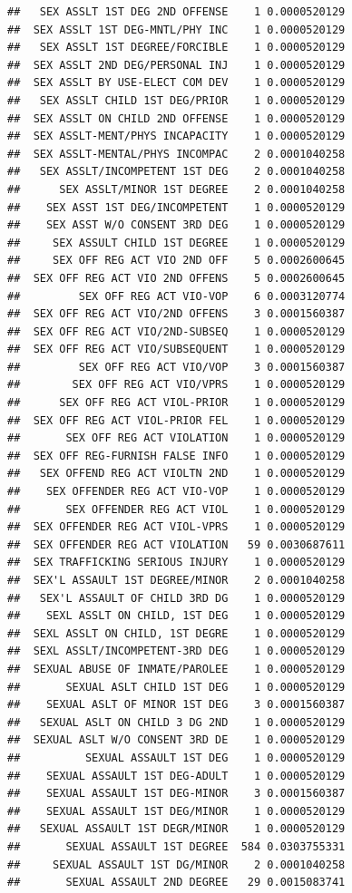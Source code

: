 \documentclass[]{book}
\begin{document}
\begin{verbatim}
##   SEX ASSLT 1ST DEG 2ND OFFENSE    1 0.0000520129
##  SEX ASSLT 1ST DEG-MNTL/PHY INC    1 0.0000520129
##   SEX ASSLT 1ST DEGREE/FORCIBLE    1 0.0000520129
##  SEX ASSLT 2ND DEG/PERSONAL INJ    1 0.0000520129
##  SEX ASSLT BY USE-ELECT COM DEV    1 0.0000520129
##   SEX ASSLT CHILD 1ST DEG/PRIOR    1 0.0000520129
##  SEX ASSLT ON CHILD 2ND OFFENSE    1 0.0000520129
##  SEX ASSLT-MENT/PHYS INCAPACITY    1 0.0000520129
##  SEX ASSLT-MENTAL/PHYS INCOMPAC    2 0.0001040258
##   SEX ASSLT/INCOMPETENT 1ST DEG    2 0.0001040258
##      SEX ASSLT/MINOR 1ST DEGREE    2 0.0001040258
##    SEX ASST 1ST DEG/INCOMPETENT    1 0.0000520129
##    SEX ASST W/O CONSENT 3RD DEG    1 0.0000520129
##     SEX ASSULT CHILD 1ST DEGREE    1 0.0000520129
##     SEX OFF REG ACT VIO 2ND OFF    5 0.0002600645
##  SEX OFF REG ACT VIO 2ND OFFENS    5 0.0002600645
##         SEX OFF REG ACT VIO-VOP    6 0.0003120774
##  SEX OFF REG ACT VIO/2ND OFFENS    3 0.0001560387
##  SEX OFF REG ACT VIO/2ND-SUBSEQ    1 0.0000520129
##  SEX OFF REG ACT VIO/SUBSEQUENT    1 0.0000520129
##         SEX OFF REG ACT VIO/VOP    3 0.0001560387
##        SEX OFF REG ACT VIO/VPRS    1 0.0000520129
##      SEX OFF REG ACT VIOL-PRIOR    1 0.0000520129
##  SEX OFF REG ACT VIOL-PRIOR FEL    1 0.0000520129
##       SEX OFF REG ACT VIOLATION    1 0.0000520129
##  SEX OFF REG-FURNISH FALSE INFO    1 0.0000520129
##   SEX OFFEND REG ACT VIOLTN 2ND    1 0.0000520129
##    SEX OFFENDER REG ACT VIO-VOP    1 0.0000520129
##       SEX OFFENDER REG ACT VIOL    1 0.0000520129
##  SEX OFFENDER REG ACT VIOL-VPRS    1 0.0000520129
##  SEX OFFENDER REG ACT VIOLATION   59 0.0030687611
##  SEX TRAFFICKING SERIOUS INJURY    1 0.0000520129
##  SEX'L ASSAULT 1ST DEGREE/MINOR    2 0.0001040258
##   SEX'L ASSAULT OF CHILD 3RD DG    1 0.0000520129
##    SEXL ASSLT ON CHILD, 1ST DEG    1 0.0000520129
##  SEXL ASSLT ON CHILD, 1ST DEGRE    1 0.0000520129
##  SEXL ASSLT/INCOMPETENT-3RD DEG    1 0.0000520129
##  SEXUAL ABUSE OF INMATE/PAROLEE    1 0.0000520129
##       SEXUAL ASLT CHILD 1ST DEG    1 0.0000520129
##    SEXUAL ASLT OF MINOR 1ST DEG    3 0.0001560387
##   SEXUAL ASLT ON CHILD 3 DG 2ND    1 0.0000520129
##  SEXUAL ASLT W/O CONSENT 3RD DE    1 0.0000520129
##          SEXUAL ASSAULT 1ST DEG    1 0.0000520129
##    SEXUAL ASSAULT 1ST DEG-ADULT    1 0.0000520129
##    SEXUAL ASSAULT 1ST DEG-MINOR    3 0.0001560387
##    SEXUAL ASSAULT 1ST DEG/MINOR    1 0.0000520129
##   SEXUAL ASSAULT 1ST DEGR/MINOR    1 0.0000520129
##       SEXUAL ASSAULT 1ST DEGREE  584 0.0303755331
##     SEXUAL ASSAULT 1ST DG/MINOR    2 0.0001040258
##       SEXUAL ASSAULT 2ND DEGREE   29 0.0015083741

\end{verbatim}
\end{document}
